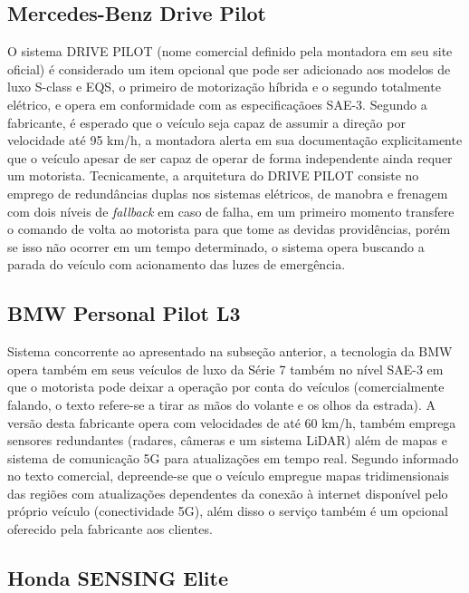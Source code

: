 \subsection{Mercedes-Benz Drive Pilot}

O sistema DRIVE PILOT (nome comercial definido pela montadora em seu site oficial) \parencite{mercedes2023drivepilot} é considerado um item opcional que pode ser adicionado aos modelos de luxo S-class e EQS, o primeiro de motorização híbrida e o segundo totalmente elétrico, e opera em conformidade com as especificaçãoes SAE-3. Segundo a fabricante, é esperado que o veículo seja capaz de assumir a direção por velocidade até 95 km/h, a montadora alerta em sua documentação explicitamente que o veículo apesar de ser capaz de operar de forma independente ainda requer um motorista. Tecnicamente, a arquitetura do DRIVE PILOT consiste no emprego de redundâncias duplas nos sistemas elétricos, de manobra e frenagem com dois níveis de \textit{fallback} em caso de falha, em um primeiro momento transfere o comando de volta ao motorista para que tome as devidas providências, porém se isso não ocorrer em um tempo determinado, o sistema opera buscando a parada do veículo com acionamento das luzes de emergência.

\subsection{BMW Personal Pilot L3}

Sistema concorrente ao apresentado na subseção anterior, a tecnologia da BMW opera também em seus veículos de luxo da Série 7 \parencite{bmw2023personalpilot} também no nível SAE-3 em que o motorista pode deixar a operação por conta do veículos (comercialmente falando, o texto refere-se a tirar as mãos do volante e os olhos da estrada). A versão desta fabricante opera com velocidades de até 60 km/h, também emprega sensores redundantes (radares, câmeras e um sistema LiDAR) além de mapas e sistema de comunicação 5G para atualizações em tempo real. Segundo informado no texto comercial, depreende-se que o veículo empregue mapas tridimensionais das regiões com atualizações dependentes da conexão à internet disponível pelo próprio veículo (conectividade 5G), além disso o serviço também é um opcional oferecido pela fabricante aos clientes.

\subsection{Honda SENSING Elite}

